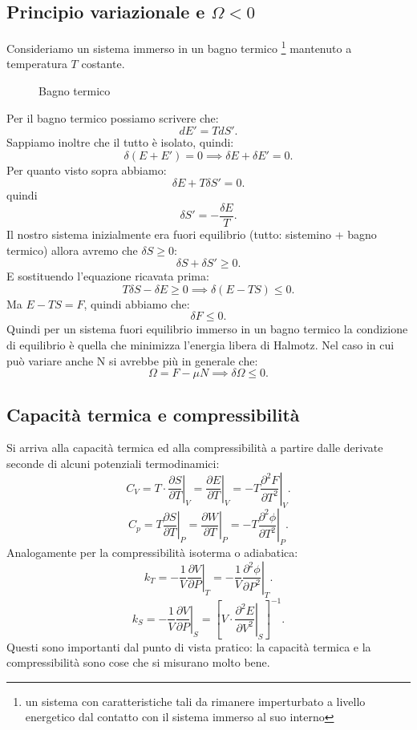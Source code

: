 \subsection{Principio variazionale e $\Omega < 0$}%
Consideriamo un sistema immerso in un bagno termico \footnote{un sistema con caratteristiche tali da rimanere imperturbato a livello energetico dal contatto con il sistema immerso al suo interno} mantenuto a temperatura $T$ costante.
\begin{figure}[H]
    \centering
    \caption{Bagno termico}
    \label{fig:bagno-termico}
\end{figure}
\noindent
Per il bagno termico possiamo scrivere che:
\[
	dE' = TdS'
.\] 
Sappiamo inoltre che il tutto è isolato, quindi:
\[
	\delta\left( E+E' \right) = 0 \implies
	\delta E + \delta E' = 0
.\]
Per quanto visto sopra abbiamo:
\[
	\delta E + T\delta S' = 0 
.\] 
quindi \[
	\delta S' = - \frac{\delta E}{T}
.\] 
Il nostro sistema inizialmente era fuori equilibrio (tutto: sistemino + bagno termico) allora avremo che $\delta S \ge 0$:
\[
	\delta S + \delta S' \ge  0
.\] 
E sostituendo l'equazione ricavata prima:
\[
	T\delta S - \delta E \ge 0 \implies
	\delta \left( E- TS \right) \le 0
.\] 
Ma $E-TS = F$, quindi abbiamo che: 
\[
	\delta F \le 0
.\] 
Quindi per un sistema fuori equilibrio immerso in un bagno termico la condizione di equilibrio è quella che minimizza l'energia libera di Halmotz.
Nel caso in cui può variare anche N si avrebbe più in generale che:
\[
	\Omega = F - \mu N \implies \delta \Omega \le  0
.\] 

\subsection{Capacità termica e compressibilità}%
Si arriva alla capacità termica ed alla compressibilità a partire dalle derivate seconde di alcuni potenziali termodinamici:
\[
	C_{V} = T\cdot \left.\frac{\partial S}{\partial T} \right|_{V} = \left.\frac{\partial E}{\partial T} \right|_{V}=
			- T \left.\frac{\partial ^2 F}{\partial T^2 } \right|_{V}
.\] \label{eq:capacita-termica}
\[
	C_{p} = T \left.\frac{\partial S}{\partial T} \right|_{P} = \left.\frac{\partial W}{\partial T}\right|_{P} = - T \left.\frac{\partial ^2 \phi}{\partial T^2} \right|_{P}
.\] 
Analogamente per la compressibilità isoterma o adiabatica:
\[
	k_{T}= -\frac{1}{V} \left.\frac{\partial V}{\partial P} \right|_{T} =
	-\frac{1}{V} \left.\frac{\partial ^2 \phi}{\partial P^2} \right|_{T}
.\] 
\[
	k_{S} = -\frac{1}{V}\left.\frac{\partial V}{\partial P} \right|_{S}=
	\left[ V\cdot \left.\frac{\partial^2 E}{\partial V^2} \right|_{S} \right] ^{-1}
.\] 
Questi sono importanti dal punto di vista pratico: la capacità termica e la compressibilità sono cose che si misurano molto bene.
